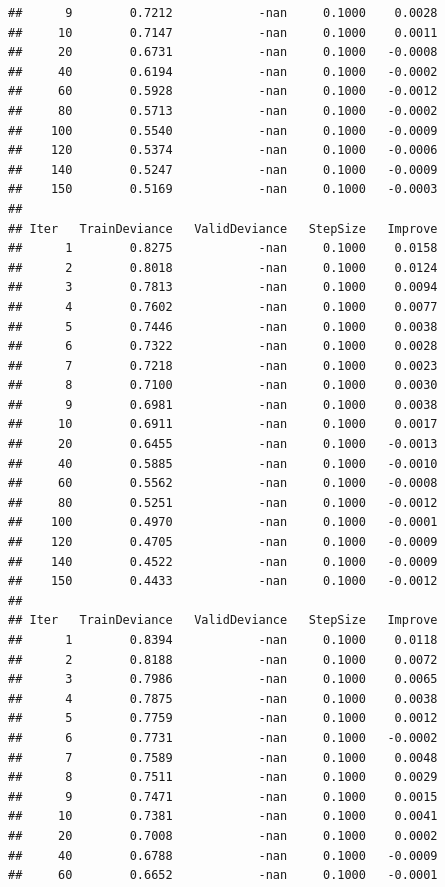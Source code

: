 \documentclass[
]{book}
\begin{document}
\begin{verbatim}
##      9        0.7212            -nan     0.1000    0.0028
##     10        0.7147            -nan     0.1000    0.0011
##     20        0.6731            -nan     0.1000   -0.0008
##     40        0.6194            -nan     0.1000   -0.0002
##     60        0.5928            -nan     0.1000   -0.0012
##     80        0.5713            -nan     0.1000   -0.0002
##    100        0.5540            -nan     0.1000   -0.0009
##    120        0.5374            -nan     0.1000   -0.0006
##    140        0.5247            -nan     0.1000   -0.0009
##    150        0.5169            -nan     0.1000   -0.0003
## 
## Iter   TrainDeviance   ValidDeviance   StepSize   Improve
##      1        0.8275            -nan     0.1000    0.0158
##      2        0.8018            -nan     0.1000    0.0124
##      3        0.7813            -nan     0.1000    0.0094
##      4        0.7602            -nan     0.1000    0.0077
##      5        0.7446            -nan     0.1000    0.0038
##      6        0.7322            -nan     0.1000    0.0028
##      7        0.7218            -nan     0.1000    0.0023
##      8        0.7100            -nan     0.1000    0.0030
##      9        0.6981            -nan     0.1000    0.0038
##     10        0.6911            -nan     0.1000    0.0017
##     20        0.6455            -nan     0.1000   -0.0013
##     40        0.5885            -nan     0.1000   -0.0010
##     60        0.5562            -nan     0.1000   -0.0008
##     80        0.5251            -nan     0.1000   -0.0012
##    100        0.4970            -nan     0.1000   -0.0001
##    120        0.4705            -nan     0.1000   -0.0009
##    140        0.4522            -nan     0.1000   -0.0009
##    150        0.4433            -nan     0.1000   -0.0012
## 
## Iter   TrainDeviance   ValidDeviance   StepSize   Improve
##      1        0.8394            -nan     0.1000    0.0118
##      2        0.8188            -nan     0.1000    0.0072
##      3        0.7986            -nan     0.1000    0.0065
##      4        0.7875            -nan     0.1000    0.0038
##      5        0.7759            -nan     0.1000    0.0012
##      6        0.7731            -nan     0.1000   -0.0002
##      7        0.7589            -nan     0.1000    0.0048
##      8        0.7511            -nan     0.1000    0.0029
##      9        0.7471            -nan     0.1000    0.0015
##     10        0.7381            -nan     0.1000    0.0041
##     20        0.7008            -nan     0.1000    0.0002
##     40        0.6788            -nan     0.1000   -0.0009
##     60        0.6652            -nan     0.1000   -0.0001

\end{verbatim}
\end{document}

